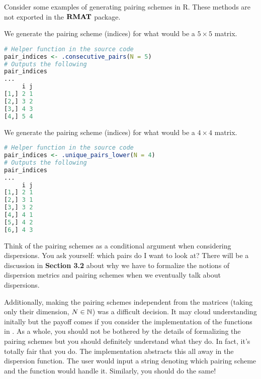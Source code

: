 
\noindent Consider some examples of generating pairing schemes in R. These methods are
not exported in the ${\textbf{RMAT}}$ package.

\begin{code}
  We generate the pairing scheme (indices) for what would be a $5 \times 5$ matrix.
\end{code}
\begin{lstlisting}[language=R]
# Helper function in the source code
pair_indices <- .consecutive_pairs(N = 5)
# Outputs the following
pair_indices
...
     i j
[1,] 2 1
[2,] 3 2
[3,] 4 3
[4,] 5 4
\end{lstlisting}

\begin{code}
  We generate the pairing scheme (indices) for what would be a $4 \times 4$ matrix.
\end{code}
\begin{lstlisting}[language=R]
# Helper function in the source code
pair_indices <- .unique_pairs_lower(N = 4)
# Outputs the following
pair_indices
...
     i j
[1,] 2 1
[2,] 3 1
[3,] 3 2
[4,] 4 1
[5,] 4 2
[6,] 4 3
\end{lstlisting}

Think of the pairing schemes as a conditional argument when considering dispersions. You ask yourself: which pairs do I want to look at?
There will be a discussion in \textbf{Section 3.2} about why we have to formalize the notions of dispersion metrics and pairing schemes when we eventually talk about dispersions.

Additionally, making the pairing schemes independent from the matrices (taking only their dimension, $N \in \mathbb{N}$) was a difficult decision.
It may cloud understanding initally but the payoff comes if you consider the implementation of the functions in \RMAT.
As a whole, you should not be bothered by the details of formalizing the pairing schemes but you should definitely understand what they do.
In fact, it's totally fair that you do. The \RMAT \; implementation abstracts this all away in the dispersion function.
The user would input a string denoting which pairing scheme and the function would handle it.
Similarly, you should do the same!


